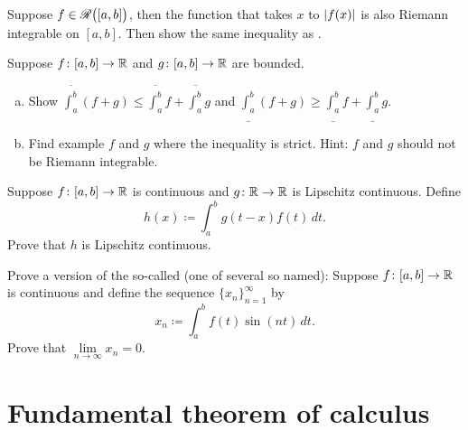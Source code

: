 \begin{exercise}[Challenging] \label{exercise:hardabsint}
Suppose $f \in {\mathscr{R}}\bigl([a,b]\bigr)$, then the function that takes $x$ to
$\left\lvert {f(x)} \right\rvert$ is also Riemann integrable on $[a,b]$.
Then show the same inequality as .
\end{exercise}

\begin{exercise}  \label{exercise:upperlowerlinineq}
Suppose $f \colon [a,b] \to {\mathbb{R}}$ and $g \colon [a,b] \to {\mathbb{R}}$
are bounded.
\begin{enumerate}[a)]
\item
Show
$\overline{\int_a^b} (f+g) \leq \overline{\int_a^b}f+\overline{\int_a^b}g$ and
$\underline{\int_a^b} (f+g) \geq
\underline{\int_a^b}f+\underline{\int_a^b}g$.
\item
Find example $f$ and $g$ where
the inequality is strict.  Hint: $f$ and $g$ should not be Riemann
integrable.
\end{enumerate}
\end{exercise}

\begin{exercise}
Suppose $f \colon [a,b] \to {\mathbb{R}}$ is continuous and $g \colon {\mathbb{R}} \to {\mathbb{R}}$ is
Lipschitz continuous.  Define
\begin{equation*}
h(x) \coloneqq \int_a^b g(t-x) f(t) \, dt .
\end{equation*}
Prove that $h$ is Lipschitz continuous.
\end{exercise}

\begin{exercise} \label{exercise:rieleblem}
Prove a version of the so-called \emph{}
(one of several so named):
Suppose $f \colon [a,b] \to {\mathbb{R}}$ is continuous and define the sequence
$\{ x_n \}_{n=1}^\infty$ by
\begin{equation*}
x_n \coloneqq \int_a^b f(t) \sin(nt) \, dt .
\end{equation*}
Prove that $\lim\limits_{n\to\infty} x_n = 0$.
\end{exercise}


\sectionnewpage
\section{Fundamental theorem of calculus}
\label{sec:ftc}


